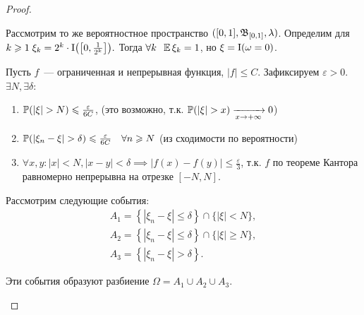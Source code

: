\begin{proof}
\begin{compactlist}
    
    \item[$\text{(r)} \notimpliedby \text{п.н.}$]
    
        Рассмотрим то же вероятностное пространство $([0, 1], \mathfrak{B}_{[0, 1]}, \lambda)$.
        Определим для $k \geqslant 1 \; \xi_k = 2^{k} \cdot \operatorname{\mathrm{I}}\bigl(\left[0, \frac{1}{2^{k}}\right]\bigr).$ 
        Тогда $\forall k \;\; \operatorname{\mathbb{E}} \xi_k = 1$, но $\xi = \operatorname{\mathrm{I}}(\omega = 0)$.
    
    \item[$\text{p} \implies \text{w}$]
    
        Пусть $f$~--- ограниченная и непрерывная функция, $|f| \leqslant C$. 
        Зафиксируем $\varepsilon > 0$. 
        $\exists N, \exists \delta$:
    
        \begin{enumerate}
            \item $\operatorname{\mathbb{P}}(|\xi| > N) \leqslant \frac{\varepsilon}{6C}$, (это возможно, т.к. $\operatorname{\mathbb{P}}(|\xi| > x) \xrightarrow[x \to +\infty]{} 0$)
            \item $\operatorname{\mathbb{P}}(|\xi_n - \xi| > \delta) \leqslant \frac{\varepsilon}{6C} \quad \forall n \geqslant N$ (из сходимости по вероятности)
            \item $\forall x, y \colon |x| < N, |x - y| < \delta \implies |f(x) - f(y)| \leqslant \frac{\varepsilon}{3}$, т.к. $f$ по теореме Кантора равномерно непрерывна на отрезке $[-N, N]$.
        \end{enumerate}
        
        Рассмотрим следующие события:
        \begin{gather*}
            A_{1}=\left\{\left|\xi_{n}-\xi\right| \leqslant \delta\right\} \cap\{|\xi|<N\}, \\
            A_{2}=\left\{\left|\xi_{n}-\xi\right| \leqslant \delta\right\} \cap\{|\xi| \geqslant N\}, \\
            A_{3}=\left\{\left|\xi_{n}-\xi\right|>\delta\right\}.
        \end{gather*}
        
        Эти события образуют разбиение $\Omega=A_{1} \cup A_{2} \cup A_{3} $. 
        

\end{compactlist}
\end{proof}
